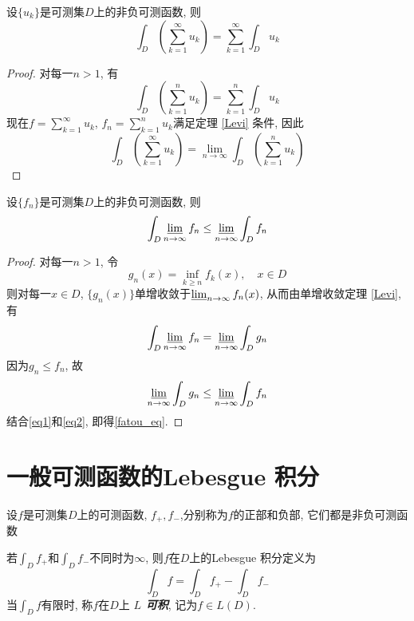 \documentclass[12pt, a4paper, oneside, UTF8]{ctexbook}  %
\begin{document}
\begin{corollary}[逐项积分]
    设$\{u_k\}$是可测集$D$上的非负可测函数, 则
    $$ \int_{D}(\sum_{k=1}^{\infty}u_k) = \sum_{k=1}^{\infty}\int_{D}u_k $$
\end{corollary}

\begin{proof}
    对每一$n>1$, 有$$ \int_{D}(\sum_{k=1}^{n}u_k) = \sum_{k=1}^{n}\int_{D}u_k $$
    现在$f=\sum_{k=1}^{\infty}u_k$, $f_n=\sum_{k=1}^{n}u_k$满足定理 \ref{Levi} 条件, 因此
    $$ \int_{D}(\sum_{k=1}^{\infty}u_k) = \lim_{n\to\infty}\int_{D}(\sum_{k=1}^{n}u_k) $$
\end{proof}


\begin{thm}[Fatou]\label{Fatou}
    设$\{f_n\}$是可测集$D$上的非负可测函数, 则
    \begin{equation} \label{fatou_eq}
        \int_{D}\varliminf_{n\to\infty}f_n \leq \varliminf_{n\to\infty}\int_{D}f_n
    \end{equation}
\end{thm}

\begin{proof}
    对每一$n>1$, 令$$ g_n(x)=\inf_{k\geq n}f_k(x), \quad x\in D $$
    则对每一$x\in D$, $\{g_n(x)\}$单增收敛于$\varliminf_{n\to\infty}f_n(x)$, 从而由单增收敛定理
    \ref{Levi}, 有
    \begin{equation} \label{eq1}
        \int_{D}\varliminf_{n\to\infty}f_n = \varliminf_{n\to\infty}\int_{D}g_n
    \end{equation}
    因为$g_n \leq f_n$, 故
    \begin{equation} \label{eq2}
        \varliminf_{n\to\infty}\int_{D}g_n \leq \varliminf_{n\to\infty}\int_{D}f_n
    \end{equation}
    结合\ref{eq1}和\ref{eq2}, 即得\ref{fatou_eq}.
\end{proof}

\section{一般可测函数的Lebesgue 积分}
设$f$是可测集$D$上的可测函数, $f_+, f_-$,分别称为$f$的正部和负部, 它们都是非负可测函数

\begin{defn}
    若$\int_{D}f_+$和$\int_{D}f_-$不同时为$\infty$, 则$f$在$D$上的Lebesgue 积分定义为
    $$ \int_{D}f = \int_{D}f_+ - \int_{D}f_- $$
    当$\int_{D}f$有限时, 称$f$在$D$上 \textbf{\emph{$L$ 可积}}, 记为$f\in L(D)$.
\end{defn}
\end{document}
